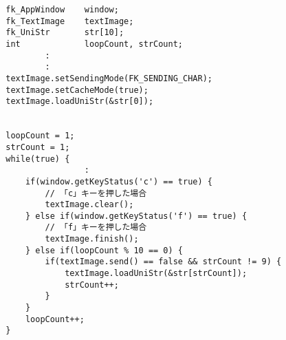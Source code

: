 \begin{breakbox}
\begin{verbatim}
        fk_AppWindow    window;
        fk_TextImage    textImage;
        fk_UniStr       str[10];
        int             loopCount, strCount;
                :
                :
        textImage.setSendingMode(FK_SENDING_CHAR);
        textImage.setCacheMode(true);
        textImage.loadUniStr(&str[0]);


        loopCount = 1;
        strCount = 1;
        while(true) {
                        :
            if(window.getKeyStatus('c') == true) {
                // 「c」キーを押した場合
                textImage.clear();
            } else if(window.getKeyStatus('f') == true) {
                // 「f」キーを押した場合
                textImage.finish();
            } else if(loopCount % 10 == 0) {
                if(textImage.send() == false && strCount != 9) {
                    textImage.loadUniStr(&str[strCount]);
                    strCount++;
                }
            }
            loopCount++;
        }
\end{verbatim}
\end{breakbox}

